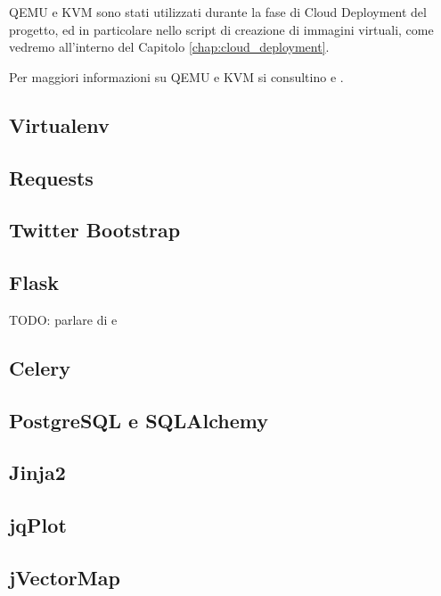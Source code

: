             \ac{QEMU} e \ac{KVM} sono stati utilizzati durante la fase di Cloud Deployment del progetto, ed in particolare nello script di creazione di immagini virtuali, come vedremo all'interno del Capitolo \ref{chap:cloud_deployment}.
            
            Per maggiori informazioni su \ac{QEMU} e \ac{KVM} si consultino \cite{kvm:wiki} e \cite{qemu:wiki}.
            
        \subsection{Virtualenv} \label{subsec:p;sl;virtualenv}
        
        \subsection{Requests} \label{subsec:p;sl;requests}
        
        \subsection{Twitter Bootstrap} \label{subsec:p;sl;twitter_bootstrap}
        
        \subsection{Flask} \label{subsec:p;sl;flask}
        
            TODO: parlare di  e 
        
        \subsection{Celery} \label{subsec:p;sl;celery}
        
        \subsection{PostgreSQL e SQLAlchemy} \label{subsec:p;sl;postgreSQL_SQLAlchemy}
        
        \subsection{Jinja2} \label{subsec:p;sl;jinja2}
        
        \subsection{jqPlot} \label{subsec:p;sl;jqplot}
        
        \subsection{jVectorMap} \label{subsec:p;sl;jvectormap}
